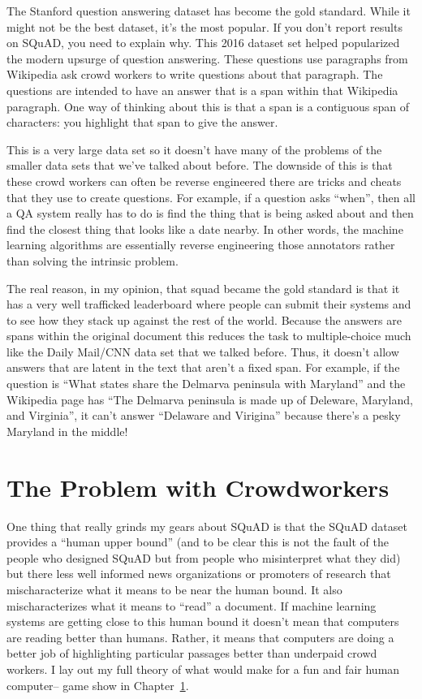 The Stanford question answering dataset has become the gold standard.
While it might not be the best dataset, it’s the most popular.  If you
don't report results on SQuAD, you need to explain why.  This 2016
dataset set helped popularized the modern upsurge of question
answering.  These questions use paragraphs from Wikipedia ask crowd
workers to write questions about that paragraph.  The questions are
intended to have an answer that is a span within that Wikipedia
paragraph.  One way of thinking about this is that a span is a
contiguous span of characters: you highlight that span to give the
answer.

This is a very large data set so it doesn't have many of the problems
of the smaller data sets that we've talked about before. The downside
of this is that these crowd workers can often be reverse engineered
there are tricks and cheats that they use to create questions.  For
example, if a question asks “when”, then all a QA system really has to
do is find the thing that is being asked about and then find the
closest thing that looks like a date nearby.  In other words, the
machine learning algorithms are essentially reverse engineering those
annotators rather than solving the intrinsic problem.

The real reason, in my opinion, that squad became the gold
standard is that it has a very well trafficked leaderboard where
people can submit their systems and to see how they stack up against
the rest of the world.  Because the answers are spans within the
original document this reduces the task to multiple-choice much like
the Daily Mail/CNN data set that we talked before.  Thus, it doesn't
allow answers that are latent in the text that aren’t a fixed span.
For example, if the question is “What states share the Delmarva
peninsula with Maryland” and the Wikipedia page has “The Delmarva
peninsula is made up of Deleware, Maryland, and Virginia”, it can’t
answer “Delaware and Virigina” because there’s a pesky Maryland in the
middle!

\section{The Problem with Crowdworkers}


One thing that really grinds my gears about SQuAD is that the SQuAD
dataset provides a “human upper bound” (and to be clear this is not
the fault of the people who designed SQuAD but from people who
misinterpret what they did) but there less well informed news
organizations or promoters of research that mischaracterize what it
means to be near the human bound.  It also mischaracterizes what it
means to “read” a document.  If machine learning systems are getting
close to this human bound it doesn't mean that computers are reading
better than humans.  Rather, it means that computers are doing a
better job of highlighting particular passages better than underpaid
crowd workers.  I lay out my full theory of what would make for a fun and fair human computer-- game show in Chapter~\ref{}.

